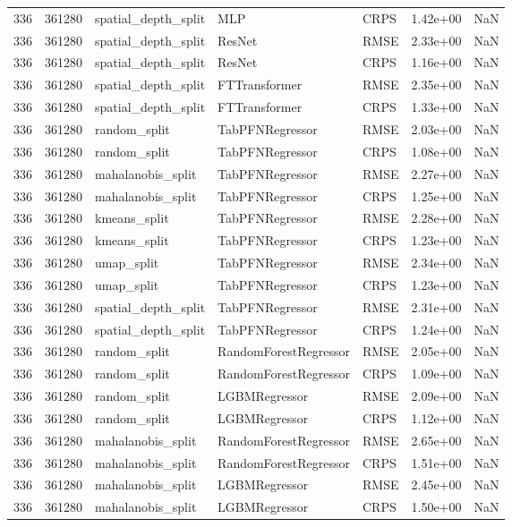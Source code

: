 \begin{tabular}{rrlllrr}
336 & 361280 & spatial\_depth\_split & MLP & CRPS & 1.42e+00 & NaN \\
336 & 361280 & spatial\_depth\_split & ResNet & RMSE & 2.33e+00 & NaN \\
336 & 361280 & spatial\_depth\_split & ResNet & CRPS & 1.16e+00 & NaN \\
336 & 361280 & spatial\_depth\_split & FTTransformer & RMSE & 2.35e+00 & NaN \\
336 & 361280 & spatial\_depth\_split & FTTransformer & CRPS & 1.33e+00 & NaN \\
336 & 361280 & random\_split & TabPFNRegressor & RMSE & 2.03e+00 & NaN \\
336 & 361280 & random\_split & TabPFNRegressor & CRPS & 1.08e+00 & NaN \\
336 & 361280 & mahalanobis\_split & TabPFNRegressor & RMSE & 2.27e+00 & NaN \\
336 & 361280 & mahalanobis\_split & TabPFNRegressor & CRPS & 1.25e+00 & NaN \\
336 & 361280 & kmeans\_split & TabPFNRegressor & RMSE & 2.28e+00 & NaN \\
336 & 361280 & kmeans\_split & TabPFNRegressor & CRPS & 1.23e+00 & NaN \\
336 & 361280 & umap\_split & TabPFNRegressor & RMSE & 2.34e+00 & NaN \\
336 & 361280 & umap\_split & TabPFNRegressor & CRPS & 1.23e+00 & NaN \\
336 & 361280 & spatial\_depth\_split & TabPFNRegressor & RMSE & 2.31e+00 & NaN \\
336 & 361280 & spatial\_depth\_split & TabPFNRegressor & CRPS & 1.24e+00 & NaN \\
336 & 361280 & random\_split & RandomForestRegressor & RMSE & 2.05e+00 & NaN \\
336 & 361280 & random\_split & RandomForestRegressor & CRPS & 1.09e+00 & NaN \\
336 & 361280 & random\_split & LGBMRegressor & RMSE & 2.09e+00 & NaN \\
336 & 361280 & random\_split & LGBMRegressor & CRPS & 1.12e+00 & NaN \\
336 & 361280 & mahalanobis\_split & RandomForestRegressor & RMSE & 2.65e+00 & NaN \\
336 & 361280 & mahalanobis\_split & RandomForestRegressor & CRPS & 1.51e+00 & NaN \\
336 & 361280 & mahalanobis\_split & LGBMRegressor & RMSE & 2.45e+00 & NaN \\
336 & 361280 & mahalanobis\_split & LGBMRegressor & CRPS & 1.50e+00 & NaN \\

\end{tabular}
